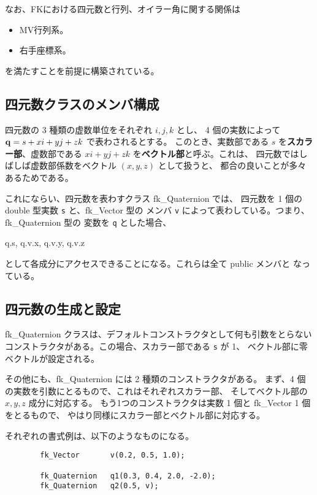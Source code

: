 なお、FKにおける四元数と行列、オイラー角に関する関係は
\begin{itemize}
 \item MV行列系。
 \item 右手座標系。
\end{itemize}
を満たすことを前提に構築されている。

\subsection{四元数クラスのメンバ構成}
四元数の 3 種類の虚数単位をそれぞれ \(i, j, k\) とし、
4 個の実数によって \(\mathbf{q} = s + xi + yj + zk\) で表わされるとする。
このとき、実数部である \(s\) を\textbf{スカラー部}、虚数部である
\(xi + yj + zk\) を\textbf{ベクトル部}と呼ぶ。これは、
四元数ではしばしば虚数部係数をベクトル \((x, y, z)\) として扱うと、
都合の良いことが多々あるためである。

これにならい、四元数を表わすクラス fk\_Quaternion では、
四元数を 1 個の double 型実数 \verb+s+ と、fk\_Vector 型の
メンバ \verb+v+ によって表わしている。つまり、fk\_Quaternion 型の
変数を \verb+q+ とした場合、
\begin{center}
q.s, \quad q.v.x, \quad q.v.y, \quad q.v.z
\end{center}
として各成分にアクセスできることになる。これらは全て public メンバと
なっている。

\subsection{四元数の生成と設定}
fk\_Quaternion クラスは、デフォルトコンストラクタとして何も引数をとらない
コンストラクタがある。この場合、スカラー部である \verb+s+ が 1、
ベクトル部に零ベクトルが設定される。

その他にも、fk\_Quaternion には 2 種類のコンストラクタがある。
まず、4 個の実数を引数にとるもので、これはそれぞれスカラー部、
そしてベクトル部の \(x, y, z\) 成分に対応する。
もう1つのコンストラクタは実数 1 個と fk\_Vector 1 個をとるもので、
やはり同様にスカラー部とベクトル部に対応する。

それぞれの書式例は、以下のようなものになる。
\\
\begin{screen}
\begin{verbatim}
        fk_Vector       v(0.2, 0.5, 1.0);

        fk_Quaternion   q1(0.3, 0.4, 2.0, -2.0);
        fk_Quaternion   q2(0.5, v);
\end{verbatim}
\end{screen}

